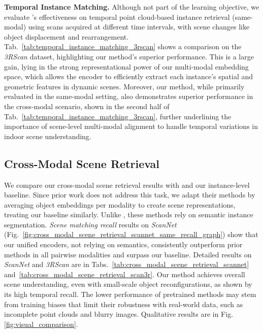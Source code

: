 

\noindent \textbf{Temporal Instance Matching.} Although not part of the learning objective, we evaluate \project{}'s effectiveness on temporal point cloud-based instance retrieval (same-modal) using scans acquired at different time intervals, with scene changes like object displacement and rearrangement. Tab.~\ref{tab:temporal_instance_matching_3rscan} shows a comparison on the \textit{3RScan} dataset, highlighting our method's superior performance. This is a large gain, lying in the strong representational power of our multi-modal embedding space, which allows the encoder to efficiently extract each instance's spatial and geometric features in dynamic scenes. Moreover, our method, while primarily evaluated in the same-modal setting, also demonstrates superior performance in the cross-modal scenario, shown in the second half of Tab.~\ref{tab:temporal_instance_matching_3rscan}, further underlining the importance of scene-level multi-modal alignment to handle temporal variations in indoor scene understanding.






\subsection{Cross-Modal Scene Retrieval}
We compare our cross-modal scene retrieval results with \cite{xue2023ulip2,pointbind} and our instance-level baseline. Since prior work does not address this task, we adapt their methods by averaging object embeddings per modality to create scene representations, treating our baseline similarly. Unlike \project{}, these methods rely on semantic instance segmentation. \textit{Scene matching recall} results on \textit{ScanNet} (Fig.~\ref{fig:cross_modal_scene_retrieval_scannet_same_recall_graph}) show that our unified encoders, not relying on semantics, consistently outperform prior methods in all pairwise modalities and surpass our baseline. Detailed results on \textit{ScanNet} and \textit{3RScan} are in Tabs.~\ref{tab:cross_modal_scene_retrieval_scannet} and~\ref{tab:cross_modal_scene_retrieval_scan3r}. Our method achieves overall scene understanding, even with small-scale object reconfigurations, as shown by its high temporal recall. The lower performance of pretrained methods may stem from training biases that limit their robustness with real-world data, such as incomplete point clouds and blurry images. Qualitative results are in Fig. \ref{fig:visual_comparison}.



